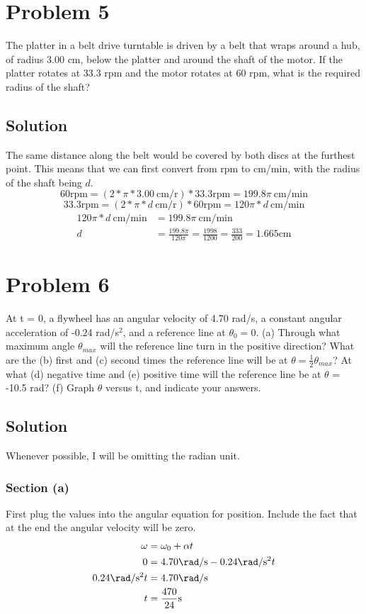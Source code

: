 \documentclass[12pt]{article}
\begin{document}
\pagebreak
\section*{Problem 5}
The platter in a belt drive turntable is driven by a belt that wraps around a hub, of radius 3.00
cm, below the platter and around the shaft of the motor. If the platter rotates at 33.3 rpm and the
motor rotates at 60 rpm, what is the required radius of the shaft?

\subsection*{Solution}
The same distance along the belt would be covered by both discs at the furthest point. This means that we can first convert from rpm to cm/min, with the radius of the shaft being $d$.
\[
    60 \text{rpm} = (2*\pi*3.00\ \text{cm/r}) * 33.3 \text{rpm} = 199.8 \pi\ \text{cm/min}
\]
\[
    33.3 \text{rpm} = (2*\pi*d\ \text{cm/r}) * 60 \text{rpm} = 120 \pi * d\ \text{cm/min}
\]
\begin{align*}
    120 \pi * d\ \text{cm/min}  &=  199.8 \pi\ \text{cm/min}\\
    d   &=  \frac{199.8 \pi}{120 \pi}
        =   \frac{1998}{1200}
        =   \frac{333}{200}
        =   \boxed{1.665 \unit{\centi\meter}}
\end{align*}

\pagebreak
\section*{Problem 6}
At t = 0, a flywheel has an angular velocity of 4.70 rad/s, a constant angular acceleration of
-0.24 rad/s$^2$, and a reference line at $\theta_0 = 0$. (a) Through what maximum angle $\theta_{max}$ will the
reference line turn in the positive direction? What are the (b) first and (c) second times the reference line will be at $\theta = \frac{1}{2}\theta_{max}$? At what (d) negative time and (e) positive time will the
reference line be at $\theta$ = -10.5 rad? (f) Graph $\theta$ versus t, and indicate your answers.

\subsection*{Solution}
Whenever possible, I will be omitting the radian unit. 
\subsubsection*{Section (a)}
First plug the values into the angular equation for position. Include the fact that at the end the angular velocity will be zero.
\begin{align*}
    \omega  &=  \omega_0 + \alpha t\\
    0   &=  4.70 \unit{\rad/\second} - 0.24 \unit{\rad/\second^2} t\\
    0.24 \unit{\rad/\second^2} t    &=  4.70 \unit{\rad/\second}\\
    t   &=  \frac{470}{24}\unit{\second}
\end{align*}
\end{document}
